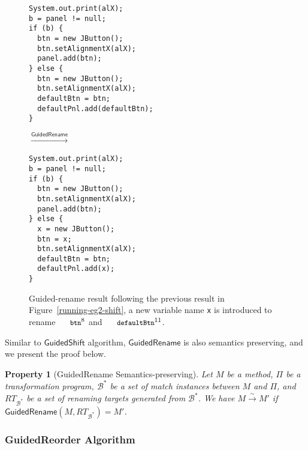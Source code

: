 \documentclass[letterpaper, USenglish]{lipics-v2016}
\newenvironment{smpage}[1]
{\begin{lrbox}{\fmbox}\begin{minipage}{#1}}
{\end{minipage}\end{lrbox}\usebox{\fmbox}}
\newcommand{\code}[1]{\texttt{\footnotesize #1}}
\theoremstyle{plain}
\newtheorem{property}[theorem]{Property}
\begin{document}
\begin{figure}[ht]
\vspace{-5pt}
\begin{center}
\begin{smpage}{0.34\columnwidth}
\begin{lstlisting}[style=patl,frame=none,basicstyle=\ttfamily\scriptsize]
System.out.print(alX);
b = panel != null;
if (b) {
  btn = new JButton();
  btn.setAlignmentX(alX);
  panel.add(btn);
} else {
  btn = new JButton();
  btn.setAlignmentX(alX);
  defaultBtn = btn;
  defaultPnl.add(defaultBtn);
}
\end{lstlisting}
\end{smpage}
\!\!\!\!\!\!$\xrightarrow{\mathsf{GuidedRename}}$~~~~~
\begin{smpage}{0.4\columnwidth}
\begin{lstlisting}[style=patl,frame=none,basicstyle=\ttfamily\scriptsize]
System.out.print(alX);
b = panel != null;
if (b) {
  btn = new JButton();
  btn.setAlignmentX(alX);
  panel.add(btn);
} else {
  x = new JButton();
  btn = x;
  btn.setAlignmentX(alX);
  defaultBtn = btn;
  defaultPnl.add(x);
}
\end{lstlisting}
\end{smpage}
\end{center}
\vspace{-15pt}
\caption{Guided-rename result following the previous result in Figure~\ref{running-eg2-shift}, a new variable name \code{x} is introduced to rename $\code{btn}^8$ and $\code{defaultBtn}^{11}$.}
\label{running-eg2-rename}
\vspace{-10pt}
\end{figure}

Similar to $\mathsf{GuidedShift}$ algorithm, $\mathsf{GuidedRename}$ is also semantics preserving, and we present the proof below.
\begin{property}[GuidedRename Semantics-preserving]
  \label{property:guidedrename_semanticspreserving}
  Let $M$ be a method, $\Pi$ be a transformation program,
  $\mathcal{B}^*$ be a set of match instances between $M$ and $\Pi$, and
  $RT_{\mathcal{B}^*}$ be a set of renaming targets generated from $\mathcal{B}^*$. We have
  $M\xrightarrow{\sim} M'$ if $\mathsf{GuidedRename}(M,
\mathit{RT}_{\mathcal{B}^*})=M'$.
\end{property}

\subsubsection{GuidedReorder Algorithm}
\end{document}
